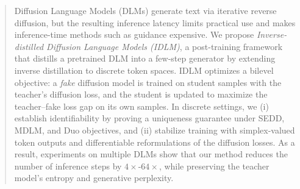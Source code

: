
\vspace{-3mm}
\begin{abstract}
Diffusion Language Models (DLMs) generate text via iterative reverse diffusion, but the resulting inference latency
limits practical use and makes inference-time methods such as guidance expensive.
We propose \emph{Inverse-distilled Diffusion Language Models (IDLM)}, a post-training framework that distills
a pretrained DLM into a few-step generator by extending inverse distillation to discrete token spaces.
IDLM optimizes a bilevel objective: a \emph{fake} diffusion model is trained on student samples with the teacher’s diffusion loss, and the student is updated to maximize the teacher--fake loss gap on its own samples.
In discrete settings, we (i) establish identifiability by proving a uniqueness guarantee under SEDD, MDLM, and Duo objectives, and (ii) stabilize training with simplex-valued token outputs and differentiable reformulations of the diffusion losses.
As a result, experiments on multiple DLMs show that our method reduces the number of inference steps by $4 \times$-$64 \times$,
while preserving the teacher model’s entropy and generative perplexity.
\vspace{-1mm}
\end{abstract}